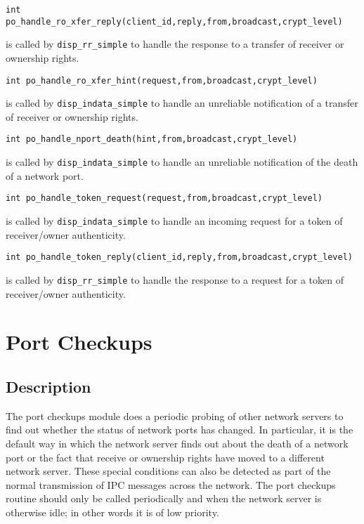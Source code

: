 \begin{verbatim}
int po_handle_ro_xfer_reply(client_id,reply,from,broadcast,crypt_level)
\end{verbatim}
is called by \verb"disp_rr_simple" to handle the response to a transfer of
receiver or ownership rights.

\begin{verbatim}
int po_handle_ro_xfer_hint(request,from,broadcast,crypt_level)
\end{verbatim}
is called by \verb"disp_indata_simple" to handle an unreliable notification
of a transfer of receiver or ownership rights.

\begin{verbatim}
int po_handle_nport_death(hint,from,broadcast,crypt_level)
\end{verbatim}
is called by \verb"disp_indata_simple" to handle an unreliable notification
of the death of a network port.

\begin{verbatim}
int po_handle_token_request(request,from,broadcast,crypt_level)
\end{verbatim}
is called by \verb"disp_indata_simple" to handle an incoming request for a
token of receiver/owner authenticity.

\begin{verbatim}
int po_handle_token_reply(client_id,reply,from,broadcast,crypt_level)
\end{verbatim}
is called by \verb"disp_rr_simple" to handle the response to a request for a
token of receiver/owner authenticity.

\section{Port Checkups}
\subsection{Description}
The port checkups module does a periodic probing of other network servers to
find out whether the status of network ports has changed.  In particular, it
is the default way in which the network server finds out about the death of
a network port or the fact that receive or ownership rights have moved to a
different network server.  These special conditions can also be detected as
part of the normal transmission of IPC messages across the network.  The
port checkups routine should only be called periodically and when the
network server is otherwise idle; in other words it is of low priority.

